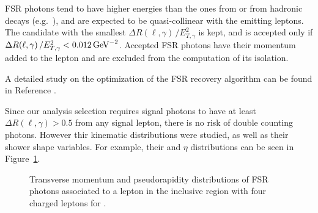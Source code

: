 FSR photons tend to have higher energies than the ones from \pileup or from hadronic decays (e.g. \PGpz\,),
and are expected to be quasi-collinear with the emitting leptons.
The candidate with the smallest $\Delta R(\ell, \gamma)\, / E_{T,\gamma}^{2}$ is kept,
and is accepted only if $\Delta R(\ell, \gamma)\, / E_{T,\gamma}^{2} < 0.012 \,\text{Ge\hspace{-.08em}V}^{-2}$.
Accepted FSR photons have their momentum added to the lepton and are excluded from the computation of its isolation.

A detailed study on the optimization of the FSR recovery algorithm can be found in Reference \cite{Sirunyan2017}.

Since our analysis selection requires signal photons to have at least $\Delta R(\ell, \gamma) > 0.5$ from any signal lepton, there is no risk of double counting photons.
However thir kinematic distributions were studied, as well as their shower shape variables.
For example, their \pt and $\eta$ distributions can be seen in Figure~\ref{fig:distributions_fsrPhotons}.

\begin{figure}
  \centering
  \hfill
  \hfill
  \hfill\mbox{}
  \caption{Transverse momentum and pseudorapidity distributions of FSR photons associated to a lepton in the inclusive region with four charged leptons for \RunII.}
  \label{fig:distributions_fsrPhotons}
\end{figure}


